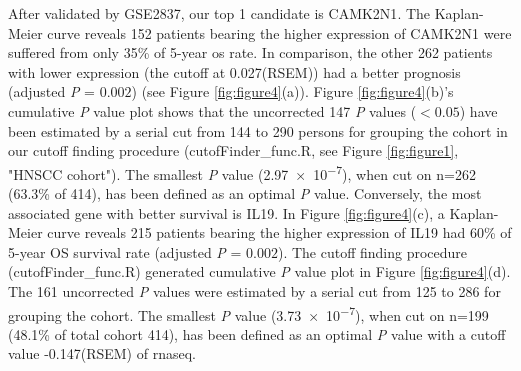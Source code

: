 \documentclass[jpm,article,submit,moreauthors,pdftex]{Definitions/mdpi}
\begin{document}
After validated by GSE2837, our top 1 candidate is \acrfull{CAMK2N1}. The Kaplan-Meier curve reveals 152 patients bearing the higher expression of \acrshort{CAMK2N1} were suffered from only 35\% of 5-year \acrshort{os} rate. In comparison, the other 262 patients with lower expression (the cutoff at 0.027(RSEM)) had a better prognosis (adjusted \textit{P} = $0.002$) (see Figure \ref{fig:figure4}(a)).
Figure \ref{fig:figure4}(b)'s cumulative \textit{P} value plot shows that the uncorrected 147 \textit{P} values ($< 0.05$) have been estimated by a serial cut from 144 to 290 persons for grouping the cohort in our cutoff finding procedure (cutofFinder\_func.R, see Figure \ref{fig:figure1}, "HNSCC cohort"). The smallest \textit{P} value (\num{2.97e-7}), when cut on n=262 (63.3\% of 414), has been defined as an optimal \textit{P} value.
Conversely, the most associated gene with better survival is \acrfull{IL19}. In Figure \ref{fig:figure4}(c), a Kaplan-Meier curve reveals 215 patients bearing the higher expression of \acrshort{IL19} had 60\% of 5-year OS survival rate (adjusted \textit{P} = $0.002$). The cutoff finding procedure (cutofFinder\_func.R) generated cumulative \textit{P} value plot in Figure \ref{fig:figure4}(d). The 161 uncorrected \textit{P} values were estimated by a serial cut from 125 to 286 for grouping the cohort. The smallest \textit{P} value (\num{3.73e-7}), when cut on n=199 (48.1\% of total cohort 414), has been defined as an optimal \textit{P} value with a cutoff value -0.147(RSEM) of \acrshort{rnaseq}.
\end{document}
